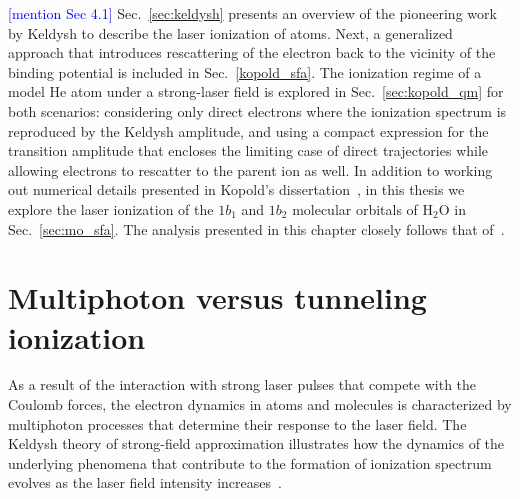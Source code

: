 \textcolor{blue}{[mention Sec 4.1]} Sec.~\ref{sec:keldysh} presents an
overview of the pioneering work by Keldysh to describe the laser
ionization of atoms. Next, a generalized approach that introduces
rescattering of the electron back to the vicinity of the binding
potential is included in Sec.~\ref{kopold_sfa}. The ionization regime
of a model He atom under a strong-laser field is explored in
Sec.~\ref{sec:kopold_qm} for both scenarios: considering only direct
electrons where the ionization spectrum is reproduced by the Keldysh
amplitude, and using a compact expression for the transition amplitude
that encloses the limiting case of direct trajectories while allowing
electrons to rescatter to the parent ion as well. In addition to
working out numerical details presented in Kopold's
dissertation~\cite{phd_Kopold}, in this thesis we explore the laser
ionization of the $1b_{1}$ and $1b_{2}$ molecular orbitals of H$_{2}$O
in Sec.~\ref{sec:mo_sfa}. The analysis presented in this chapter
closely follows that of~\cite{Kopold_1997sfa}.




\section{\label{sec:mpi&tunneling} Multiphoton versus tunneling ionization}

As a result of the interaction with strong laser pulses that compete
with the Coulomb forces, the electron dynamics in atoms and molecules
is characterized by multiphoton processes that determine their
response to the laser field. The Keldysh theory of strong-field
approximation illustrates how the dynamics of the underlying phenomena
that contribute to the formation of ionization spectrum evolves as the
laser field intensity increases~\cite{KeldyshSFA}.

